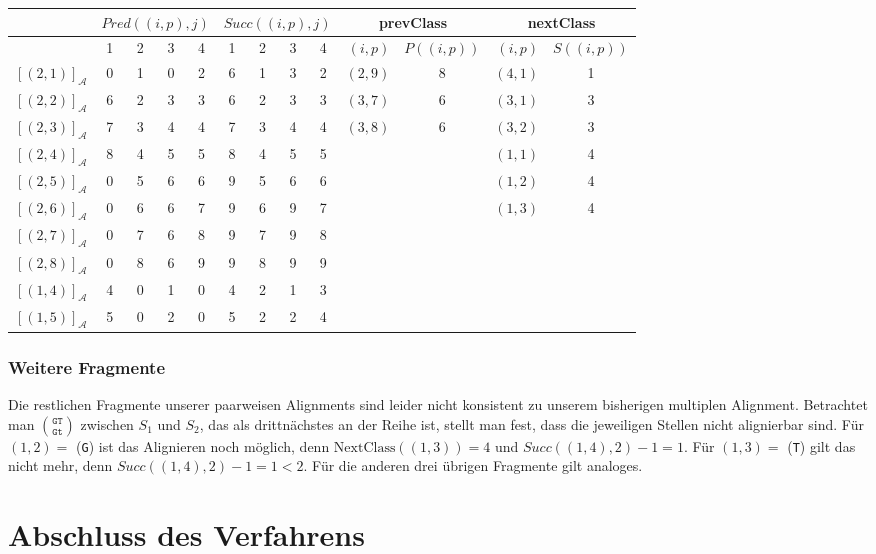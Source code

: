 \begin{tabular}{r|cccc|cccc||r|c|r|c}
	& \multicolumn{4}{c|}{$Pred((i,p),j)$} & \multicolumn{4}{c||}{$Succ((i,p),j)$} & \multicolumn{2}{c|}{\textrm{prevClass}} & \multicolumn{2}{c}{\textrm{nextClass}} \\ \hline
	\diagbox[dir=NW]{$(i,p)$}{$j$} & 1 & 2 & 3 & 4 & 1 & 2 & 3 & 4 & $(i,p)$ & $P((i,p))$ & $(i,p)$ & $S((i,p))$ \\ \hline
	$[(2,1)]_{\mathcal{A}}$ & 0 & 1 & 0 & 2 & 6 & 1 & 3 & 2 & $(2,9)$ & 8 & $(4,1)$ & 1 \\
	$[(2,2)]_{\mathcal{A}}$ & 6 & 2 & 3 & 3 & 6 & 2 & 3 & 3 & $(3,7)$ & 6 & $(3,1)$ & 3 \\
	$[(2,3)]_{\mathcal{A}}$ & 7 & 3 & 4 & 4 & 7 & 3 & 4 & 4 & $(3,8)$ & 6 & $(3,2)$ & 3 \\
	$[(2,4)]_{\mathcal{A}}$ & 8 & 4 & 5 & 5 & 8 & 4 & 5 & 5 & & & $(1,1)$ & 4 \\
	$[(2,5)]_{\mathcal{A}}$ & 0 & 5 & 6 & 6 & 9 & 5 & 6 & 6 & & & $(1,2)$ & 4 \\
	$[(2,6)]_{\mathcal{A}}$ & 0 & 6 & 6 & 7 & 9 & 6 & 9 & 7 & & & $(1,3)$ & 4 \\
	$[(2,7)]_{\mathcal{A}}$ & 0 & 7 & 6 & 8 & 9 & 7 & 9 & 8 & & & & \\
	$[(2,8)]_{\mathcal{A}}$ & 0 & 8 & 6 & 9 & 9 & 8 & 9 & 9 & & & & \\
	$[(1,4)]_{\mathcal{A}}$ & 4 & 0 & 1 & 0 & 4 & 2 & 1 & 3 & & & & \\
	$[(1,5)]_{\mathcal{A}}$ & 5 & 0 & 2 & 0 & 5 & 2 & 2 & 4 & & & & 
\end{tabular}
\normalsize

\subsubsection{Weitere Fragmente}

Die restlichen Fragmente unserer paarweisen Alignments sind leider nicht konsistent zu unserem bisherigen multiplen Alignment. Betrachtet man ${\texttt{GT}}\choose{\texttt{Gt}}$ zwischen $S_1$ und $S_2$, das als drittnächstes an der Reihe ist, stellt man fest, dass die jeweiligen Stellen nicht alignierbar sind. Für $(1,2) =$ (\texttt{G}) ist das Alignieren noch möglich, denn $\textrm{NextClass}((1,3)) = 4$ und $Succ((1,4),2) - 1 = 1$. Für $(1,3) =$ (\texttt{T}) gilt das nicht mehr, denn $Succ((1,4),2) - 1 = 1 < 2$. Für die anderen drei übrigen Fragmente gilt analoges.

\section{Abschluss des Verfahrens}

